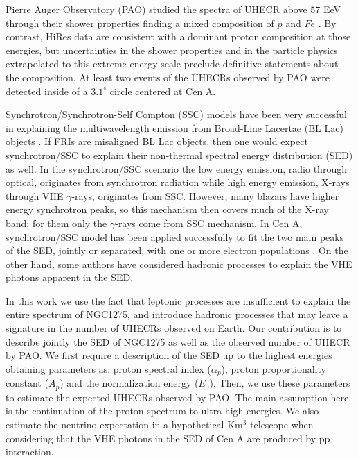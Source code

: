 \documentclass[useAMS,usenatbib,a4]{mn2e}
\begin{document}
Pierre Auger Observatory (PAO) studied the spectra of UHECR above $57$ EeV through their shower properties finding a mixed composition of $p$ and $Fe$ \citep{yam07, abr08, ung07}.  By contrast,  HiRes data are consistent with a dominant proton composition at those energies, but uncertainties in the shower properties  \citep{ung07} and in the particle physics extrapolated to this extreme energy scale \citep{eng07} preclude definitive statements about the composition. At least two events of the UHECRs observed by PAO were detected \citep{abr07,abr08} inside of a $3.1^{\circ}$ circle centered at Cen A.



Synchrotron/Synchrotron-Self Compton (SSC) models have been very successful in explaining the multiwavelength emission from Broad-Line Lacertae (BL Lac) objects \citep{blo96, tav98}. If FRIs are misaligned BL Lac objects, then one would  expect synchrotron/SSC to explain their non-thermal spectral energy distribution (SED) as well. In the synchrotron/SSC scenario the low energy  emission, radio through optical, originates from synchrotron radiation while high energy emission, X-rays through VHE $\gamma$-rays, originates from SSC.  
However, many blazars have higher energy synchrotron peaks,  so this mechanism then covers much of the X-ray band; for them only the $\gamma$-rays come from SSC mechanism. In Cen A, synchrotron/SSC model has been applied successfully to fit the two main peaks of the SED, jointly or separated, with one or more electron populations \citep{abd10, chi01, len08, ore09, har09}.   On the other hand, some authors \citep{der09, gup08, bec09} have considered  hadronic processes to explain the VHE photons apparent in the SED. 


In this work we use the fact  that leptonic processes are insufficient to explain the entire spectrum of NGC1275, and introduce hadronic processes that may
leave a signature in the number of UHECRs observed on Earth.  Our contribution is to describe jointly the SED of NGC1275 as well as the observed number of UHECR by PAO. We first require a description of the SED up to the highest energies obtaining parameters as:  proton spectral index ($\alpha_p$),  proton proportionality constant ($A_p$) and  the normalization energy ($E_0$). Then, we use these parameters to estimate the expected UHECRs observed by PAO. The main assumption here, is the continuation of the proton spectrum to ultra high energies. We also estimate the neutrino expectation in a hypothetical Km$^3$ telescope when considering that the VHE photons in the SED of Cen A  are produced by pp interaction. 
\end{document}
